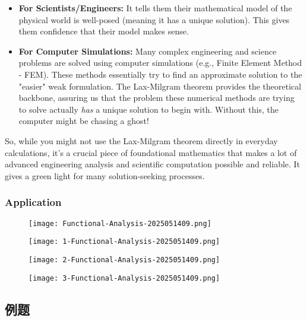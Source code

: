 \begin{itemize}
	\item \textbf{For Scientists/Engineers:} It tells them their mathematical model of the physical world is well-posed (meaning it has a unique solution). This gives them confidence that their model makes sense.
	\item \textbf{For Computer Simulations:} Many complex engineering and science problems are solved using computer simulations (e.g., Finite Element Method - FEM). These methods essentially try to find an approximate solution to the "easier" weak formulation. The Lax-Milgram theorem provides the theoretical backbone, assuring us that the problem these numerical methods are trying to solve actually \textit{has} a unique solution to begin with. Without this, the computer might be chasing a ghost!
\end{itemize}

So, while you might not use the Lax-Milgram theorem directly in everyday calculations, it's a crucial piece of foundational mathematics that makes a lot of advanced engineering analysis and scientific computation possible and reliable. It gives a green light for many solution-seeking processes.

\subsubsection{Application}

\begin{figure}[H]
\centering
\texttt{[image: Functional-Analysis-2025051409.png]}
\label{}
\end{figure}
\begin{figure}[H]
\centering
\texttt{[image: 1-Functional-Analysis-2025051409.png]}
\label{}
\end{figure}
\begin{figure}[H]
\centering
\texttt{[image: 2-Functional-Analysis-2025051409.png]}
\label{}
\end{figure}
\begin{figure}[H]
\centering
\texttt{[image: 3-Functional-Analysis-2025051409.png]}
\label{}
\end{figure}

\subsection{例题}

